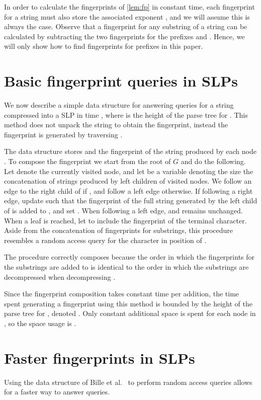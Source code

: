 \documentclass[11pt]{article}
\newcommand{\slp}{\ensuremath{G} }
\begin{document}
\noindent In order to calculate the fingerprints of \autoref{lem:fp} in constant time, each fingerprint for a string  must also store the associated exponent , and we will assume this is always the case. Observe that a fingerprint for any substring  of a string can be calculated by subtracting the two fingerprints for the prefixes  and . Hence, we will only show how to find fingerprints for prefixes in this paper.

\section{Basic fingerprint queries in SLPs}
We now describe a simple data structure for answering  queries for a string  compressed into a SLP  in time , where  is the height of the parse tree for . This method does not unpack the string to obtain the fingerprint, instead the fingerprint is generated by traversing . 



The data structure stores  and the fingerprint  of the string produced by each node . To compose the fingerprint  we start from the root of \slp and do the following. Let  denote the currently visited node, and let  be a variable denoting the size the concatenation of strings produced by left children of visited nodes. We follow an edge to the right child of  if , and follow a left edge otherwise. If following a right edge, update  such that the fingerprint of the full string generated by the left child of  is added to , and set . When following a left edge,  and  remains unchanged. When a leaf is reached, let  to include the fingerprint of the terminal character. Aside from the concatenation of fingerprints for substrings, this procedure resembles a random access query for the character in position  of .









The procedure correctly composes  because the order in which the fingerprints for the substrings are added to  is identical to the order in which the substrings are decompressed when decompressing . 

Since the fingerprint composition takes constant time per addition, the time spent generating a fingerprint using this method is bounded by the height of the parse tree for , denoted . Only constant additional space is spent for each node in , so the space usage is .

\section{Faster fingerprints in SLPs}
Using the data structure of Bille et al.~\cite{bille2011random} to perform random access queries allows for a faster way to answer  queries.
\end{document}
